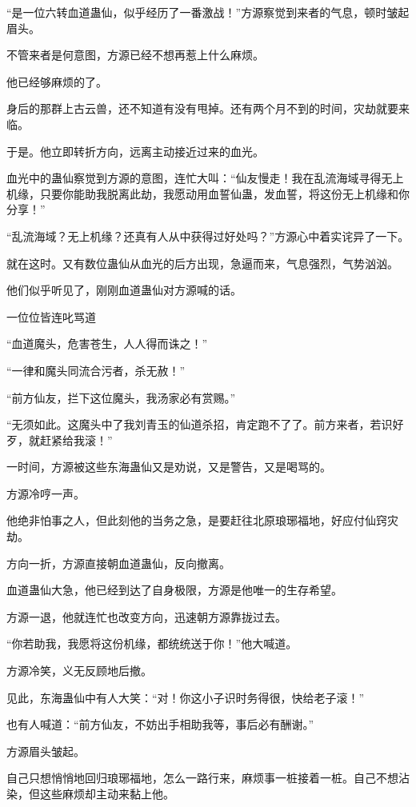 \begin{this_body}
“是一位六转血道蛊仙，似乎经历了一番激战！”方源察觉到来者的气息，顿时皱起眉头。

不管来者是何意图，方源已经不想再惹上什么麻烦。

他已经够麻烦的了。

身后的那群上古云兽，还不知道有没有甩掉。还有两个月不到的时间，灾劫就要来临。

于是。他立即转折方向，远离主动接近过来的血光。

血光中的蛊仙察觉到方源的意图，连忙大叫：“仙友慢走！我在乱流海域寻得无上机缘，只要你能助我脱离此劫，我愿动用血誓仙蛊，发血誓，将这份无上机缘和你分享！”

“乱流海域？无上机缘？还真有人从中获得过好处吗？”方源心中着实诧异了一下。

就在这时。又有数位蛊仙从血光的后方出现，急逼而来，气息强烈，气势汹汹。

他们似乎听见了，刚刚血道蛊仙对方源喊的话。

一位位皆连叱骂道

“血道魔头，危害苍生，人人得而诛之！”

“一律和魔头同流合污者，杀无赦！”

“前方仙友，拦下这位魔头，我汤家必有赏赐。”

“无须如此。这魔头中了我刘青玉的仙道杀招，肯定跑不了了。前方来者，若识好歹，就赶紧给我滚！”

一时间，方源被这些东海蛊仙又是劝说，又是警告，又是喝骂的。

方源冷哼一声。

他绝非怕事之人，但此刻他的当务之急，是要赶往北原琅琊福地，好应付仙窍灾劫。

方向一折，方源直接朝血道蛊仙，反向撤离。

血道蛊仙大急，他已经到达了自身极限，方源是他唯一的生存希望。

方源一退，他就连忙也改变方向，迅速朝方源靠拢过去。

“你若助我，我愿将这份机缘，都统统送于你！”他大喊道。

方源冷笑，义无反顾地后撤。

见此，东海蛊仙中有人大笑：“对！你这小子识时务得很，快给老子滚！”

也有人喊道：“前方仙友，不妨出手相助我等，事后必有酬谢。”

方源眉头皱起。

自己只想悄悄地回归琅琊福地，怎么一路行来，麻烦事一桩接着一桩。自己不想沾染，但这些麻烦却主动来黏上他。


\end{this_body}
